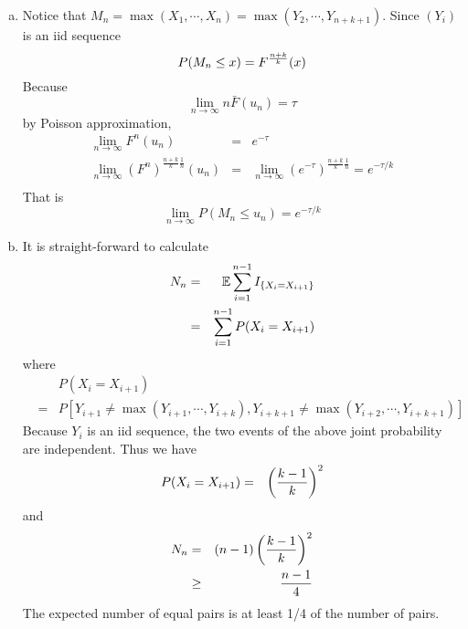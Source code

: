 \documentclass{report}
\begin{document}
\begin{enumerate}[1.]
\begin{enumerate}[(a)]
  \item Notice that $M_n=\max(X_1, \cdots, X_n) = \max(Y_2, \cdots,
    Y_{n+k+1})$. Since $(Y_i)$ is an iid sequence
    \[
    P(M_n \le x) = F^{n+k \over k}(x)
    \]
    Because
    \[
    \lim_{n \to \infty} n \bar{F}(u_n) = \tau
    \]
    by Poisson approximation,
    \begin{eqnarray*}
      \lim_{n \to \infty} F^n(u_n) &=& e^{-\tau} \\
      \lim_{n \to \infty} (F^n)^{\frac{n+k}{k} \frac{1}{n}} (u_n) &=&
      \lim_{n \to \infty} (e^{-\tau})^{\frac{n+k}{k} \frac{1}{n}} =
      e^{-\tau / k} \\
    \end{eqnarray*}
    That is
    \[
    \lim_{n \to \infty} P(M_n \le u_n) = e^{-\tau / k}
    \]
  \item It is straight-forward to calculate
    \begin{eqnarray*}
      N_n &=& \mathbb{E} \sum_{i=1}^{n-1} I_{\{X_i = X_{i+1}\}} \\
      &=& \sum_{i=1}^{n-1} P(X_i = X_{i+1}) \\
    \end{eqnarray*}
    where
    \begin{eqnarray*}
      && P(X_i = X_{i+1}) \\
      &=& P[Y_{i+1} \ne \max(Y_{i+1}, \cdots,
      Y_{i+k}), Y_{i+k+1} \ne \max(Y_{i+2}, \cdots, Y_{i+k+1})]
    \end{eqnarray*}
    Because $Y_i$ is an iid sequence, the two events of the above
    joint probability are independent. Thus we have
    \begin{eqnarray*}
      P(X_i = X_{i+1}) &=& \left({k-1 \over k}\right)^2
    \end{eqnarray*}
    and
    \begin{eqnarray*}
      N_n &=& (n-1) \left({k-1 \over k}\right)^2 \\
      &\ge& {n-1 \over 4}
    \end{eqnarray*}
    The expected number of equal pairs is at least 1/4 of the number
    of pairs.
  \end{enumerate}
\end{enumerate}
\end{document}

